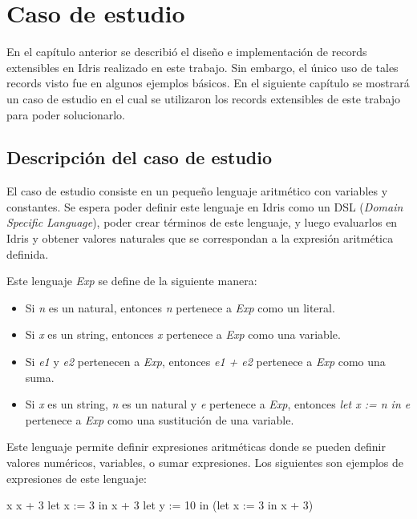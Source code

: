 
\chapter{Caso de estudio}
\label{ch:4}

En el capítulo anterior se describió el diseño e implementación de records extensibles en Idris realizado en este trabajo. Sin embargo, el único uso de tales records visto fue en algunos ejemplos básicos. En el siguiente capítulo se mostrará un caso de estudio en el cual se utilizaron los records extensibles de este trabajo para poder solucionarlo.

\section{Descripción del caso de estudio}

El caso de estudio consiste en un pequeño lenguaje aritmético con variables y constantes. Se espera poder definir este lenguaje en Idris como un DSL (\textit{Domain Specific Language}), poder crear términos de este lenguaje, y luego evaluarlos en Idris y obtener valores naturales que se correspondan a la expresión aritmética definida.

Este lenguaje \textit{Exp} se define de la siguiente manera:
\begin{itemize}
\item Si \textit{n} es un natural, entonces \textit{n} pertenece a \textit{Exp} como un literal.
\item Si \textit{x} es un string, entonces \textit{x} pertenece a \textit{Exp} como una variable.
\item Si \textit{e1} y \textit{e2} pertenecen a \textit{Exp}, entonces \textit{e1 + e2} pertenece a \textit{Exp} como una suma.
\item Si \textit{x} es un string, \textit{n} es un natural y \textit{e} pertenece a \textit{Exp}, entonces \textit{let x := n in e} pertenece a \textit{Exp} como una sustitución de una variable.
\end{itemize}

Este lenguaje permite definir expresiones aritméticas donde se pueden definir valores numéricos, variables, o sumar expresiones. Los siguientes son ejemplos de expresiones de este lenguaje:

\begin{code}
x
x + 3
let x := 3 in x + 3
let y := 10 in (let x := 3 in x + 3)
\end{code}

